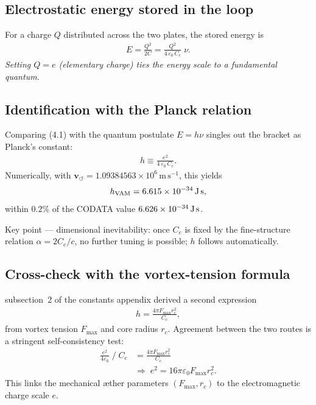 \documentclass[a4paper,12pt]{article}
\begin{document}
\subsection{Electrostatic energy stored in the loop}

For a charge $Q$ distributed across the two plates, the stored energy is
\begin{align}
    E = \frac{Q^2}{2C}
      = \frac{Q^2}{4\,\varepsilon_0\,C_e}\;\nu.
    \tag{4.1}
\end{align}
\textit{Setting $Q=e$ (elementary charge) ties the energy scale to a fundamental quantum.}

\subsection{Identification with the Planck relation}

Comparing (4.1) with the quantum postulate $E = h\nu$ singles out the bracket as Planck’s constant:
\begin{align}
    h \equiv \frac{e^{2}}{4\,\varepsilon_0\,C_e}.
    \tag{5.1}
\end{align}
Numerically, with $\mathbf{v}_{\scriptscriptstyle\boldsymbol{\circlearrowleft}} = 1.09384563\times10^{6}\,\text{m}\,\text{s}^{-1}$, this yields
\[
    h_{\text{VAM}} = 6.615\times10^{-34}\,\text{J\,s},
\]
within $0.2\%$ of the CODATA value $6.626\times10^{-34}\,\text{J\,s}$.

Key point --- dimensional inevitability: once $C_e$ is fixed by the fine-structure relation $\alpha = 2C_e/c$, no further tuning is possible; $h$ follows automatically.

\subsection{Cross-check with the vortex-tension formula}

subsection~2 of the constants appendix derived a second expression
\begin{align}
    h = \frac{4\pi F_{\max} r_c^{2}}{C_e},
\end{align}
from vortex tension $F_{\max}$ and core radius $r_c$. Agreement between the two routes is a stringent self-consistency test:
\begin{align*}
    \frac{e^{2}}{4\varepsilon_0}\;\big/\;C_e
    &= \frac{4\pi F_{\max} r_c^{2}}{C_e} \\
    &\Longrightarrow\;
    e^{2} = 16\pi\varepsilon_0 F_{\max} r_c^{2}.
\end{align*}
This links the mechanical æther parameters $(F_{\max}, r_c)$ to the electromagnetic charge scale $e$.
\end{document}
